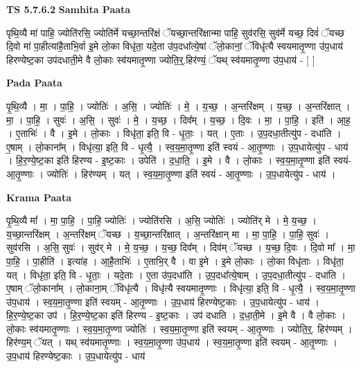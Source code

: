 \documentclass[17pt]{extarticle}
\begin{document}
\textbf{TS 5.7.6.2 } \newline
\textbf{Samhita Paata} \newline

पृथि॒व्यै मा॑ पाहि॒ ज्योति॑रसि॒ ज्योति॑र्मे यच्छा॒न्तरि॑क्षं ॅयच्छा॒न्तरि॑क्षान्मा पाहि॒ सुव॑रसि॒ सुव॑र्मे यच्छ॒ दिवं॑ ॅयच्छ दि॒वो मा॑ पा॒हीत्या॑है॒ताभि॒र्वा इ॒मे लो॒का विधृ॑ता॒ यदे॒ता उ॑प॒दधा᳚त्ये॒षां ॅलो॒कानां॒ ॅविधृ॑त्यै स्वयमातृ॒ण्णा उ॑प॒धाय॑ हिरण्येष्ट॒का उप॑दधाती॒मे वै लो॒काः स्व॑यमातृ॒ण्णा ज्योति॒र्॒.हिर॑ण्यं॒ ॅयथ् स्व॑यमातृ॒ण्णा उ॑प॒धाय॑ - [  ] \newline

\textbf{Pada Paata} \newline

पृ॒थि॒व्यै । मा॒ । पा॒हि॒ । ज्योतिः॑ । अ॒सि॒ । ज्योतिः॑ । मे॒ । य॒च्छ॒ । अ॒न्तरि॑क्षम् । य॒च्छ॒ । अ॒न्तरि॑क्षात् । मा॒ । पा॒हि॒ । सुवः॑ । अ॒सि॒ । सुवः॑ । मे॒ । य॒च्छ॒ । दिव᳚म् । य॒च्छ॒ । दि॒वः । मा॒ । पा॒हि॒ । इति॑ । आ॒ह॒ । ए॒ताभिः॑ । वै । इ॒मे । लो॒काः । विधृ॑ता॒ इति॒ वि - धृ॒ताः॒ । यत् । ए॒ताः । उ॒प॒दधा॒तीत्यु॑प - दधा॑ति । ए॒षाम् । लो॒काना᳚म् । विधृ॑त्या॒ इति॒ वि - धृ॒त्यै॒ । स्व॒य॒मा॒तृ॒ण्णा इति॑ स्वयं - आ॒तृ॒ण्णाः । उ॒प॒धायेत्यु॑प - धाय॑ । हि॒र॒ण्ये॒ष्ट॒का इति॑ हिरण्य - इ॒ष्ट॒काः । उपेति॑ । द॒धा॒ति॒ । इ॒मे । वै । लो॒काः । स्व॒य॒मा॒तृ॒ण्णा इति॑ स्वयं-आ॒तृ॒ण्णाः । ज्योतिः॑ । हिर॑ण्यम् । यत् । स्व॒य॒मा॒तृ॒ण्णा इति॑ स्वयं - आ॒तृ॒ण्णाः । उ॒प॒धायेत्यु॑प - धाय॑ ।  \newline


\textbf{Krama Paata} \newline

पृ॒थि॒व्यै मा᳚ । मा॒ पा॒हि॒ । पा॒हि॒ ज्योतिः॑ । ज्योति॑रसि । अ॒सि॒ ज्योतिः॑ । ज्योति॑र् मे । मे॒ य॒च्छ॒ । य॒च्छा॒न्तरि॑क्षम् । अ॒न्तरि॑क्षम् ॅयच्छ । य॒च्छा॒न्तरि॑क्षात् । अ॒न्तरि॑क्षान् मा । मा॒ पा॒हि॒ । पा॒हि॒ सुवः॑ । सुव॑रसि । अ॒सि॒ सुवः॑ । सुव॑र् मे । मे॒ य॒च्छ॒ । य॒च्छ॒ दिव᳚म् । दिव॑म् ॅयच्छ । य॒च्छ॒ दि॒वः । दि॒वो मा᳚ । मा॒ पा॒हि॒ । पा॒हीति॑ । इत्या॑ह । आ॒है॒ताभिः॑ । ए॒ताभि॒र् वै । वा इ॒मे । इ॒मे लो॒काः । लो॒का विधृ॑ताः । विधृ॑ता॒ यत् । विधृ॑ता॒ इति॒ वि - धृ॒ताः॒ । यदे॒ताः । ए॒ता उ॑प॒दधा॑ति । उ॒प॒दधा᳚त्ये॒षाम् । उ॒प॒दधा॒तीत्यु॑प - दधा॑ति । ए॒षाम् ॅलो॒काना᳚म् । लो॒काना॒म् ॅविधृ॑त्यै । विधृ॑त्यै स्वयमातृ॒ण्णाः । विधृ॑त्या॒ इति॒ वि - धृ॒त्यै॒ । स्व॒य॒मा॒तृ॒ण्णा उ॑प॒धाय॑ । स्व॒य॒मा॒तृ॒ण्णा इति॑ स्वयम् - आ॒तृ॒ण्णाः । उ॒प॒धाय॑ हिरण्येष्ट॒काः । उ॒प॒धायेत्यु॑प - धाय॑ । हि॒र॒ण्ये॒ष्ट॒का उप॑ । हि॒र॒ण्ये॒ष्ट॒का इति॑ हिरण्य - इ॒ष्ट॒काः । उप॑ दधाति । द॒धा॒ती॒मे । इ॒मे वै । वै लो॒काः । लो॒काः स्व॑यमातृ॒ण्णाः । स्व॒य॒मा॒तृ॒ण्णा ज्योतिः॑ । स्व॒य॒मा॒तृ॒ण्णा इति॑ स्वयम् - आ॒तृ॒ण्णाः । ज्योति॒र्॒. हिर॑ण्यम् । हिर॑ण्य॒म् ॅयत् । यथ् स्व॑यमातृ॒ण्णाः । स्व॒य॒मा॒तृ॒ण्णा उ॑प॒धाय॑ । स्व॒य॒मा॒तृ॒ण्णा इति॑ स्वयम् - आ॒तृ॒ण्णाः । उ॒प॒धाय॑ हिरण्येष्ट॒काः । उ॒प॒धायेत्यु॑प - धाय॑ \newline
\end{document}
